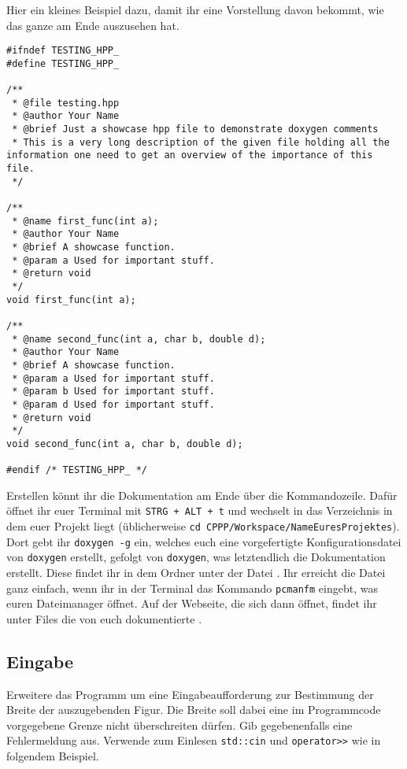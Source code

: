 Hier ein kleines Beispiel dazu, damit ihr eine Vorstellung davon bekommt, wie das ganze am Ende auszusehen hat.

\begin{lstlisting}
#ifndef TESTING_HPP_
#define TESTING_HPP_

/**
 * @file testing.hpp
 * @author Your Name
 * @brief Just a showcase hpp file to demonstrate doxygen comments
 * This is a very long description of the given file holding all the information one need to get an overview of the importance of this file.
 */

/**
 * @name first_func(int a);
 * @author Your Name
 * @brief A showcase function.
 * @param a Used for important stuff.
 * @return void
 */
void first_func(int a);

/**
 * @name second_func(int a, char b, double d);
 * @author Your Name
 * @brief A showcase function.
 * @param a Used for important stuff.
 * @param b Used for important stuff.
 * @param d Used for important stuff.
 * @return void
 */
void second_func(int a, char b, double d);

#endif /* TESTING_HPP_ */
\end{lstlisting}

Erstellen könnt ihr die Dokumentation am Ende über die Kommandozeile.
Dafür öffnet ihr euer Terminal mit \lstinline{STRG + ALT + t} und wechselt in das Verzeichnis in dem euer Projekt liegt (üblicherweise \lstinline{cd CPPP/Workspace/NameEuresProjektes}).
Dort gebt ihr \lstinline{doxygen -g} ein, welches euch eine vorgefertigte Konfigurationsdatei von \texttt{doxygen} erstellt, gefolgt von \lstinline{doxygen}, was letztendlich die Dokumentation erstellt.
Diese findet ihr in dem Ordner  unter der Datei .
Ihr erreicht die Datei ganz einfach, wenn ihr in der Terminal das Kommando \lstinline{pcmanfm} eingebt, was euren Dateimanager öffnet.
Auf der Webseite, die sich dann öffnet, findet ihr unter Files die von euch dokumentierte .

\subsection{Eingabe}
Erweitere das Programm um eine Eingabeaufforderung zur Bestimmung der Breite der auszugebenden Figur.
Die Breite soll dabei eine im Programmcode vorgegebene Grenze nicht überschreiten dürfen.
Gib gegebenenfalls eine Fehlermeldung aus.
Verwende zum Einlesen \lstinline{std::cin} und \lstinline{operator>>} wie in folgendem Beispiel.

